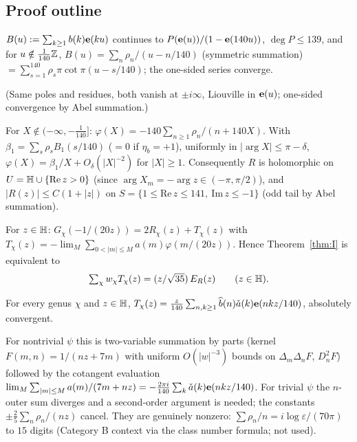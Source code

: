 \subsection{Proof outline}
\begin{lemma}
$B(u):=\sum_{k\ge1}b(k)\mathbf{e}(ku)$ continues to $P(\mathbf{e}(u))/(1-\mathbf{e}(140u))$, $\deg P\le139$, and for $u\notin\frac1{140}\mathbb{Z}$,
$B(u)=\sum_n\rho_n/(u-n/140)$ (symmetric summation) $=\sum_{s=1}^{140}\rho_s\pi\cot\pi(u-s/140)$; the one-sided series converge.
\end{lemma}
\noindent(Same poles and residues, both vanish at $\pm i\infty$, Liouville in $\mathbf{e}(u)$; one-sided convergence by Abel summation.)

\begin{lemma}
For $X\notin(-\infty,-\tfrac1{140}]$: $\varphi(X)=-140\sum_{n\ge1}\rho_n/(n+140X)$. With $\beta_1=\sum_s\rho_sB_1(s/140)$ ($=0$ if $\eta_b=+1$), uniformly in
$|\arg X|\le\pi-\delta$, $\varphi(X)=\beta_1/X+O_\delta(|X|^{-2})$ for $|X|\ge1$. Consequently $R$ is holomorphic on $U=\mathbb{H}\cup\{\mathrm{Re}\,z>0\}$ (since
$\arg X_m=-\arg z\in(-\pi,\pi/2)$), and $|R(z)|\le C(1+|z|)$ on $S=\{1\le\mathrm{Re}\,z\le141,\ \mathrm{Im}\,z\le-1\}$ (odd tail by Abel summation).
\end{lemma}

\begin{proposition}
For $z\in\mathbb{H}$: $G_\chi(-1/(20z))=2R_\chi(z)+T_\chi(z)$ with $T_\chi(z)=-\lim_M\sum_{0<|m|\le M}a(m)\varphi(m/(20z))$. Hence Theorem~\ref{thm:I} is equivalent to
\begin{equation}\label{eq:star}\textstyle
\sum_\chi w_\chi T_\chi(z)=(z/\sqrt{35})\,E_R(z)\qquad(z\in\mathbb{H}).
\end{equation}
\end{proposition}

\begin{proposition}
For every genus $\chi$ and $z\in\mathbb{H}$, $T_\chi(z)=\frac z{140}\sum_{n,k\ge1}\widehat b(n)\check a(k)\mathbf{e}(nkz/140)$, absolutely convergent.
\end{proposition}
\noindent For nontrivial $\psi$ this is two-variable summation by parts (kernel $F(m,n)=1/(nz+7m)$ with uniform $O(|w|^{-3})$ bounds on
$\Delta_m\Delta_nF$, $D_n^2F$) followed by the cotangent evaluation
$\lim_M\sum_{|m|\le M}a(m)/(7m+nz)=-\tfrac{2\pi i}{140}\sum_k\check a(k)\mathbf{e}(nkz/140)$. For trivial $\psi$ the $n$-outer sum diverges and a second-order
argument is needed; the constants $\pm\tfrac25\sum_n\rho_n/(nz)$ cancel. They are genuinely nonzero:
$\sum\rho_n/n=i\log\varepsilon/(70\pi)$ to $15$ digits (Category B context via the class number formula; not used).

